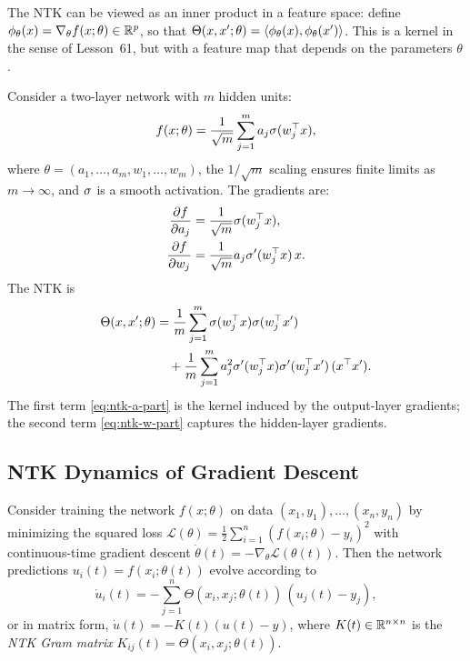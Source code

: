 \documentclass[11pt,a4paper]{article}
\begin{document}
\begin{remark}
\label{rem:ntk-feature}
The NTK can be viewed as an inner product in a feature space: define
$\phi_\theta(x) = \nabla_\theta f(x; \theta) \in \mathbb{R}^p$, so that
$\Theta(x, x'; \theta) = \langle \phi_\theta(x),
\phi_\theta(x') \rangle$.  This is a kernel in the sense of
Lesson~61, but with a feature map that depends on the parameters
$\theta$.
\end{remark}

\begin{example}
\label{ex:ntk-two-layer}
Consider a two-layer network with $m$ hidden units:
\[
  f(x; \theta) = \frac{1}{\sqrt{m}} \sum_{j=1}^{m}
    a_j \sigma(w_j^\top x),
\]
where $\theta = (a_1, \ldots, a_m, w_1, \ldots, w_m)$, the
$1/\sqrt{m}$ scaling ensures finite limits as $m \to \infty$, and
$\sigma$ is a smooth activation.  The gradients are:
\begin{align*}
  \frac{\partial f}{\partial a_j} &= \frac{1}{\sqrt{m}}
    \sigma(w_j^\top x), \\
  \frac{\partial f}{\partial w_j} &= \frac{1}{\sqrt{m}}
    a_j \sigma'(w_j^\top x) \, x.
\end{align*}
The NTK is
\begin{align}
  \Theta(x, x'; \theta) &= \frac{1}{m} \sum_{j=1}^{m}
    \sigma(w_j^\top x) \sigma(w_j^\top x')
    \label{eq:ntk-a-part} \\
  &\quad + \frac{1}{m} \sum_{j=1}^{m} a_j^2
    \sigma'(w_j^\top x) \sigma'(w_j^\top x')
    \, (x^\top x'). \label{eq:ntk-w-part}
\end{align}
The first term \eqref{eq:ntk-a-part} is the kernel induced by the
output-layer gradients; the second term \eqref{eq:ntk-w-part}
captures the hidden-layer gradients.
\end{example}

\subsection{NTK Dynamics of Gradient Descent}

\begin{proposition}
\label{prop:gd-dynamics}
Consider training the network $f(x; \theta)$ on data
$(x_1, y_1), \ldots, (x_n, y_n)$ by minimizing the squared loss
$\mathcal{L}(\theta) = \frac{1}{2} \sum_{i=1}^{n}
(f(x_i; \theta) - y_i)^2$
with continuous-time gradient descent $\dot{\theta}(t) =
-\nabla_\theta \mathcal{L}(\theta(t))$.  Then the network predictions
$u_i(t) = f(x_i; \theta(t))$ evolve according to
\begin{equation}
\label{eq:gd-dynamics}
  \dot{u}_i(t) = -\sum_{j=1}^{n}
    \Theta(x_i, x_j; \theta(t)) \, (u_j(t) - y_j),
\end{equation}
or in matrix form, $\dot{u}(t) = -K(t)(u(t) - y)$, where
$K(t) \in \mathbb{R}^{n \times n}$ is the \emph{NTK Gram matrix}
$K_{ij}(t) = \Theta(x_i, x_j; \theta(t))$.
\end{proposition}
\end{document}
